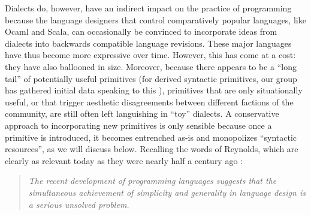 Dialects do, however, have an indirect impact on the practice of programming because the language designers that control comparatively popular languages, like Ocaml and Scala, can occasionally be convinced to incorporate  ideas from dialects  into backwards compatible language revisions. %
These major languages have thus become more expressive over time. However, this has come at a cost: they have also ballooned in size. Moreover, because there appears to be a ``long tail'' of potentially useful primitives (for derived syntactic primitives, our group has gathered initial data speaking to this \cite{TSLs}),  primitives that are only situationally useful, or that trigger aesthetic disagreements between different factions of the community, are still often left languishing in ``toy'' dialects. A conservative approach to incorporating new primitives is only sensible because once a primitive is introduced, it becomes entrenched as-is and monopolizes ``syntactic resources'', as we will discuss below. Recalling the words of  Reynolds, which are clearly as relevant today as they were nearly half a century ago \cite{Reynolds70}:%
  
\begin{quote}\textit{The recent development of programming languages suggests that the simul\-taneous achievement of simplicity 
and generality in language design is a serious unsolved 
problem.}%
\end{quote}

